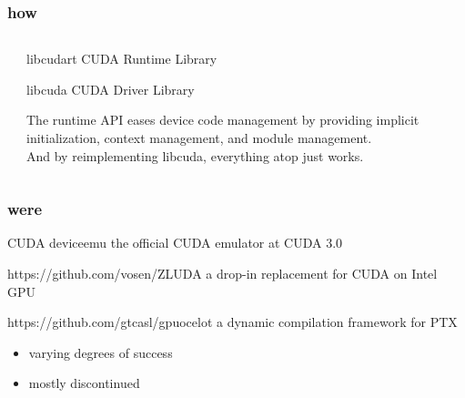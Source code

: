 \documentclass{beamer}
\begin{document}
\begin{frame}
  \frametitle{how}
  \begin{columns}
    \begin{column}{0.3\linewidth}
      \begin{center}
      \end{center}
    \end{column}
    \begin{column}{0.7\linewidth}
      \begin{block}{libcudart}
        CUDA Runtime Library
      \end{block}
      \begin{block}{libcuda}
        CUDA Driver Library
      \end{block}
      The runtime API eases device code management by providing implicit initialization, context management, and module management. \\
      And by reimplementing libcuda, everything atop just works.
    \end{column}
  \end{columns}
\end{frame}
\begin{frame}
  \frametitle{were}
  \begin{block}{CUDA deviceemu}
    the official CUDA emulator at CUDA 3.0
  \end{block}
  \begin{exampleblock}{https://github.com/vosen/ZLUDA}
    a drop-in replacement for CUDA on Intel GPU
  \end{exampleblock}
  \begin{block}{https://github.com/gtcasl/gpuocelot}
    a dynamic compilation framework for PTX
  \end{block}
  \begin{itemize}
    \item varying degrees of success
    \item mostly discontinued
  \end{itemize}
\end{frame}
\end{document}
